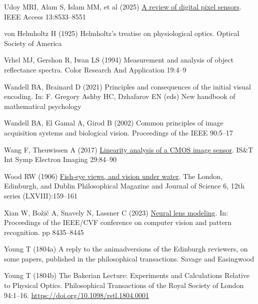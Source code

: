 \documentclass[
  letterpaper,
]{book}
\newlength{\cslhangindent}
\newenvironment{CSLReferences}[2] %
 {\begin{list}{}{%
  \setlength{\itemindent}{0pt}
  \setlength{\leftmargin}{0pt}
  \setlength{\parsep}{0pt}
  \ifodd #1
   \setlength{\leftmargin}{\cslhangindent}
   \setlength{\itemindent}{-1\cslhangindent}
  \fi
  \setlength{\itemsep}{#2\baselineskip}}}
 {\end{list}}
\begin{document}
\begin{CSLReferences}{1}{1}
Udoy MRI, Alam S, Islam MM, et al (2025)
\href{http://dx.doi.org/10.1109/ACCESS.2025.3526879}{A review of digital
pixel sensors}. IEEE Access 13:8533--8551

von Helmholtz H (1925) Helmholtz's treatise on physiological optics.
Optical Society of America

Vrhel MJ, Gershon R, Iwan LS (1994) Measurement and analysis of object
reflectance spectra. Color Research And Application 19:4--9

Wandell BA, Brainard D (2021) Principles and consequences of the initial
visual encoding. In: F. Gregory Ashby HC, Dzhafarov EN (eds) New
handbook of mathematical psychology

Wandell BA, El Gamal A, Girod B (2002) Common principles of image
acquisition systems and biological vision. Proceedings of the IEEE
90:5--17

Wang F, Theuwissen A (2017)
\href{http://dx.doi.org/10.2352/issn.2470-1173.2017.11.imse-191}{Linearity
analysis of a {CMOS} image sensor}. IS\&T Int Symp Electron Imaging
29:84--90

Wood RW (1906)
\href{https://en.wikipedia.org/wiki/Fisheye_lens}{Fish-eye views, and
vision under water}. The London, Edinburgh, and Dublin Philosophical
Magazine and Journal of Science 6, 12th series (LXVIII):159--161

Xian W, Božič A, Snavely N, Lassner C (2023)
\href{https://openaccess.thecvf.com/content/CVPR2023/html/Xian_Neural_Lens_Modeling_CVPR_2023_paper.html}{Neural
lens modeling}. In: Proceedings of the IEEE/CVF conference on computer
vision and pattern recognition. pp 8435--8445

Young T (1804a) A reply to the animadversions of the {Edinburgh}
reviewers, on some papers, published in the philosophical transactions.
{Savage and Easingwood}

Young T (1804b) {The Bakerian Lecture: Experiments and Calculations
Relative to Physical Optics}. Philosophical Transactions of the Royal
Society of London 94:1--16. \url{https://doi.org/10.1098/rstl.1804.0001}

\end{CSLReferences}


\backmatter
\end{document}
